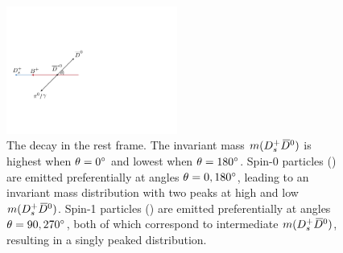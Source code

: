 \begin{figure}[!h]
    \centering
    \includegraphics[width=0.5\textwidth]{figs/B2DsKK/partreco_decay.pdf}
    \caption{The \decay{\Bp}{\Dsp(\decay{\Dstarzb}{\Dzb \piz/\Pgamma})} decay in the \Dstarzb rest frame. The invariant mass $m({{D}^+_{s}}{{\kern 0.2em\overline{\kern -0.2em D}{}}{}^0})$ is highest when $\theta = 0^{\circ}$ and lowest when $\theta = 180^{\circ}$. Spin-0 particles (\piz) are emitted preferentially at angles $\theta = 0, 180^{\circ}$, leading to an invariant mass distribution with two peaks at high and low $m({{D}^+_{s}}{{\kern 0.2em\overline{\kern -0.2em D}{}}{}^0})$. Spin-1 particles (\Pgamma) are emitted preferentially at angles $\theta = 90,270^{\circ}$, both of which correspond to intermediate $m({{D}^+_{s}}{{\kern 0.2em\overline{\kern -0.2em D}{}}{}^0})$, resulting in a singly peaked distribution.} 
    \label{fig:B2DsKK_partreco_decay}   
\end{figure}


